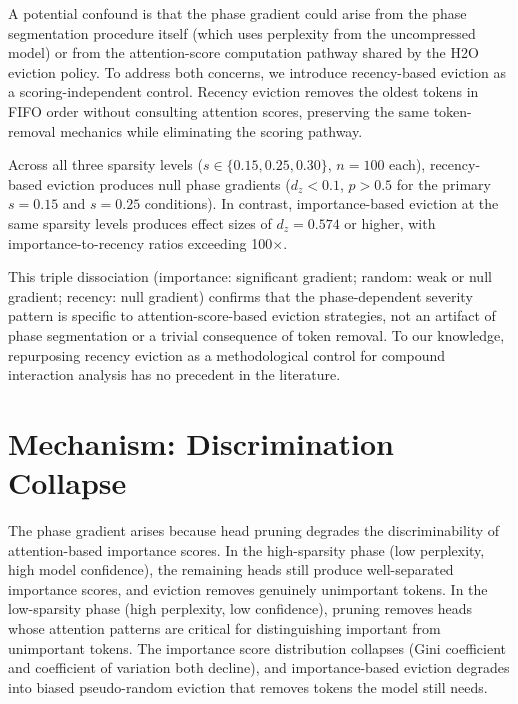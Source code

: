 \documentclass[11pt,a4paper]{article}
\begin{document}
A potential confound is that the phase gradient could arise from the phase segmentation procedure itself (which uses perplexity from the uncompressed model) or from the attention-score computation pathway shared by the H2O eviction policy. To address both concerns, we introduce recency-based eviction as a scoring-independent control. Recency eviction removes the oldest tokens in FIFO order without consulting attention scores, preserving the same token-removal mechanics while eliminating the scoring pathway.

Across all three sparsity levels ($s \in \{0.15, 0.25, 0.30\}$, $n{=}100$ each), recency-based eviction produces null phase gradients ($d_z < 0.1$, $p > 0.5$ for the primary $s{=}0.15$ and $s{=}0.25$ conditions). In contrast, importance-based eviction at the same sparsity levels produces effect sizes of $d_z{=}0.574$ or higher, with importance-to-recency ratios exceeding 100$\times$.

This triple dissociation (importance: significant gradient; random: weak or null gradient; recency: null gradient) confirms that the phase-dependent severity pattern is specific to attention-score-based eviction strategies, not an artifact of phase segmentation or a trivial consequence of token removal. To our knowledge, repurposing recency eviction as a methodological control for compound interaction analysis has no precedent in the literature.

\section{Mechanism: Discrimination Collapse}\label{sec:mechanism}

The phase gradient arises because head pruning degrades the discriminability of attention-based importance scores. In the high-sparsity phase (low perplexity, high model confidence), the remaining heads still produce well-separated importance scores, and eviction removes genuinely unimportant tokens. In the low-sparsity phase (high perplexity, low confidence), pruning removes heads whose attention patterns are critical for distinguishing important from unimportant tokens. The importance score distribution collapses (Gini coefficient and coefficient of variation both decline), and importance-based eviction degrades into biased pseudo-random eviction that removes tokens the model still needs.
\end{document}
